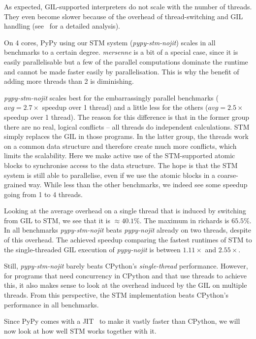 \documentclass{sigplanconf}
\begin{document}
As expected, GIL-supported interpreters do not scale with the number
of threads. They even become slower because of the overhead of
thread-switching and GIL handling (see~\cite{beazley10} for a detailed
analysis).

On 4 cores, PyPy using our STM system (\emph{pypy-stm-nojit}) scales
in all benchmarks to a certain degree. \emph{mersenne} is a bit of a
special case, since it is easily parallelisable but a few of the
parallel computations dominate the runtime and cannot be made faster
easily by parallelisation. This is why the benefit of adding more
threads than 2 is diminishing.

\emph{pypy-stm-nojit} scales best for the embarrassingly parallel
benchmarks ($avg=2.7\times$ speedup over 1 thread) and a little less
for the others ($avg=2.5\times$ speedup over 1 thread). The reason for
this difference is that in the former group there are no real, logical
conflicts -- all threads do independent calculations. STM simply
replaces the GIL in those programs. In the latter group, the threads
work on a common data structure and therefore create much more
conflicts, which limits the scalability. Here we make active use of
the STM-supported atomic blocks to synchronise access to the data
structure. The hope is that the STM system is still able to
parallelise, even if we use the atomic blocks in a coarse-grained
way. While less than the other benchmarks, we indeed see some speedup
going from 1 to 4 threads.

Looking at the average overhead on a single thread that is induced by
switching from GIL to STM, we see that it is $\approx 40.1\%$. The
maximum in richards is $65.5\%$. In all benchmarks \emph{pypy-stm-nojit}
beats \emph{pypy-nojit} already on two threads, despite of this
overhead.  The achieved speedup comparing the fastest runtimes of STM
to the single-threaded GIL execution of \emph{pypy-nojit} is between
$1.11\times$ and $2.55\times$.

Still, \emph{pypy-stm-nojit} barely beats CPython's \emph{single-thread}
performance. However, for
programs that need concurrency in CPython and that use threads to
achieve this, it also makes sense to look at the overhead induced by
the GIL on multiple threads. From this perspective, the STM
implementation beats CPython's performance in all benchmarks.

Since PyPy comes with a JIT~\cite{cfbolz09} to make it vastly faster
than CPython, we will now look at how well STM works together with it.
\end{document}
